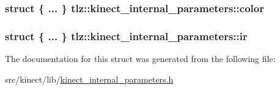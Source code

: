 \subsubsection[{\texorpdfstring{color}{color}}]{\setlength{\rightskip}{0pt plus 5cm}struct \{ ... \}   tlz\+::kinect\+\_\+internal\+\_\+parameters\+::color}\hypertarget{structtlz_1_1kinect__internal__parameters_a2c38ef1e11008eb5244bca830ccb6494}{}\label{structtlz_1_1kinect__internal__parameters_a2c38ef1e11008eb5244bca830ccb6494}
\subsubsection[{\texorpdfstring{ir}{ir}}]{\setlength{\rightskip}{0pt plus 5cm}struct \{ ... \}   tlz\+::kinect\+\_\+internal\+\_\+parameters\+::ir}\hypertarget{structtlz_1_1kinect__internal__parameters_a3005aa9c7e136dd9149305563d210d02}{}\label{structtlz_1_1kinect__internal__parameters_a3005aa9c7e136dd9149305563d210d02}


The documentation for this struct was generated from the following file\+:\begin{DoxyCompactItemize}
\item 
src/kinect/lib/\hyperlink{kinect__internal__parameters_8h}{kinect\+\_\+internal\+\_\+parameters.\+h}\end{DoxyCompactItemize}
